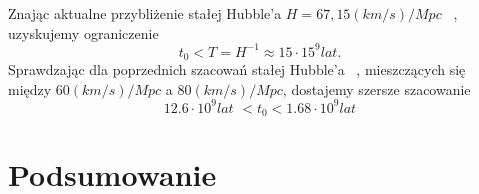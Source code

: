 \documentclass[12pt]{article}
\begin{document}
	Znając aktualne przybliżenie stałej Hubble'a $H = 67,15 (km/s)/Mpc$ ~\cite{stalaHubble}, uzyskujemy ograniczenie
	\begin{equation}
		t_{0} < T = H^{-1} \approx 15\cdot 15^9 lat.
	\end{equation}
	Sprawdzając dla poprzednich szacowań stałej Hubble'a ~\cite{staraHubble}, mieszczących się między $60 (km/s)/Mpc$ a $80 (km/s)/Mpc$, dostajemy szersze szacowanie
	\begin{equation}
		12.6\cdot10^9 lat\,\, < t_{0} < 1.68\cdot 10^9 lat
	\end{equation}
	
	
	
	
	\section{Podsumowanie}
	

	
	
	
\end{document}
